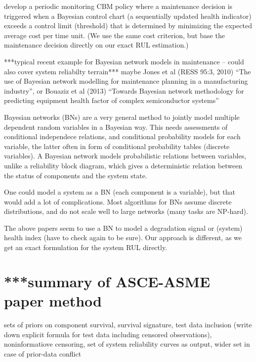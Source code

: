 \documentclass[authoryear]{elsarticle}
\begin{document}
\cite{2011:kim-et-al} develop a periodic monitoring CBM policy
where a maintenance decision is triggered when
a Bayesian control chart (a sequentially updated health indicator) %
exceeds a control limit (threshold) that is determined
by minimizing the expected average cost per time unit.
(We use the same cost criterion, but base the maintenance decision directly on our exact RUL estimation.)

***typical recent example for Bayesian network models in maintenance -- could also cover system reliabilty terrain***
maybe Jones et al (RESS 95:3, 2010) ``The use of Bayesian network modelling for maintenance planning in a manufacturing industry'',
or Bouaziz et al (2013) ``Towards Bayesian network methodology for predicting equipment health factor of complex semiconductor systems''

\begin{scriptsize}
Bayesian networks (BNs) are a very general method to jointly model multiple dependent random variables in a Bayesian way. 
This needs assessments of conditional independece relations, and conditional probability models for each variable,
the latter often in form of conditional probability tables (discrete variables).
A Bayesian network models probabilistic relations between variables,
unlike a reliability block diagram, which gives a deterministic relation
between the status of components and the system state.

One could model a system as a BN (each component is a variable),
but that would add a lot of complications.
Most algorithms for BNs assume discrete distributions,
and do not scale well to large networks (many tasks are NP-hard).

The above papers seem to use a BN to model a degradation signal or (system) health index (have to check again to be sure).
Our approach is different, as we get an exact formulation for the system RUL directly.

\end{scriptsize}


\section{***summary of ASCE-ASME paper method}

sets of priors on component survival,
survival signature,
test data inclusion
(write down explicit formula for test data including censored observations),
noninformatiove censoring,
set of system reliability curves as output,
wider set in case of prior-data conflict
\end{document}
